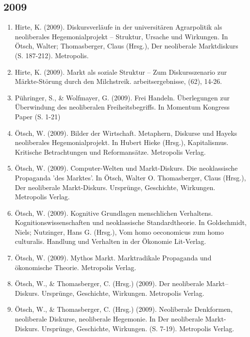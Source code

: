 \subsection*{2009}
\begin{enumerate}
	 \item Hirte, K. (2009). Diskursverläufe in der universitären Agrarpolitik als neoliberales Hegemonialprojekt – Struktur, Ursache und Wirkungen. In Ötsch, Walter; Thomasberger, Claus (Hrsg.), Der neoliberale Marktdiskurs (S. 187-212). Metropolis.
	 \item Hirte, K. (2009). Markt als soziale Struktur -- Zum Diskursszenario zur \glqq Märkte-Störung\grqq{} durch den Milchstreik. arbeitsergebnisse, (62), 14-26.
	 \item Pühringer, S., \& Wolfmayer, G. (2009). Frei Handeln. Überlegungen zur Überwindung des neoliberalen Freiheitsbegriffs. In Momentum Kongress Paper (S. 1-21)
	 \item Ötsch, W. (2009). Bilder der Wirtschaft. Metaphern, Diskurse und Hayeks neoliberales Hegemonialprojekt. In Hubert Hieke (Hrsg.), Kapitalismus. Kritische Betrachtungen und Reformansätze. Metropolis Verlag.
	 \item Ötsch, W. (2009). Computer-Welten und Markt-Diskurs. Die neoklassische Propaganda 'des Marktes'. In Ötsch, Walter O. Thomasberger, Claus (Hrsg.), Der neoliberale Markt-Diskurs. Ursprünge, Geschichte, Wirkungen. Metropolis Verlag.
	 \item Ötsch, W. (2009). Kognitive Grundlagen menschlichen Verhaltens. Kognitionswissenschaften und neoklassische Standardtheorie. In Goldschmidt, Niels; Nutzinger, Hans G. (Hrsg.), Vom homo oeconomicus zum homo culturalis. Handlung und Verhalten in der Ökonomie Lit-Verlag.
	 \item Ötsch, W. (2009). Mythos Markt. Marktradikale Propaganda und ökonomische Theorie. Metropolis Verlag.
	 \item Ötsch, W., \& Thomasberger, C. (Hrsg.) (2009). Der neoliberale Markt–Diskurs. Ursprünge, Geschichte, Wirkungen. Metropolis Verlag.
	 \item Ötsch, W., \& Thomasberger, C. (Hrsg.) (2009). Neoliberale Denkformen, neoliberale Diskurse, neoliberale Hegemonie. In Der neoliberale Markt-Diskurs. Ursprünge, Geschichte, Wirkungen. (S. 7-19). Metropolis Verlag.
\end{enumerate}
